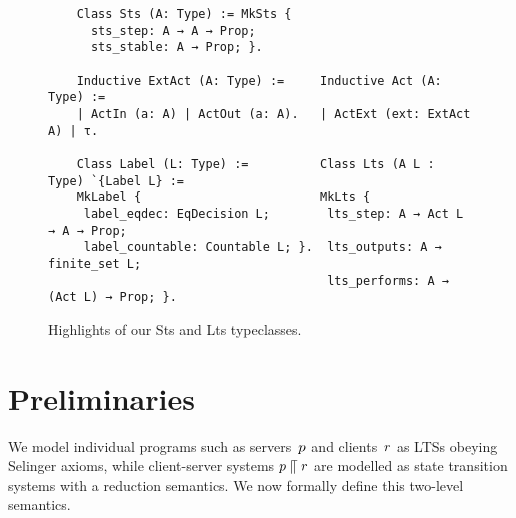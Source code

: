 

\begin{figure}[t]
  \hrulefill
  \begin{verbatim}
    Class Sts (A: Type) := MkSts {
      sts_step: A → A → Prop;
      sts_stable: A → Prop; }.

    Inductive ExtAct (A: Type) :=     Inductive Act (A: Type) :=
    | ActIn (a: A) | ActOut (a: A).   | ActExt (ext: ExtAct A) | τ.

    Class Label (L: Type) :=          Class Lts (A L : Type) `{Label L} := 
    MkLabel {                         MkLts {
     label_eqdec: EqDecision L;        lts_step: A → Act L → A → Prop;
     label_countable: Countable L; }.  lts_outputs: A → finite_set L;
                                       lts_performs: A → (Act L) → Prop; }.
  \end{verbatim}
  \caption{Highlights of our Sts and Lts typeclasses.}
  \label{fig:mechanisation-lts}
  \label{fig:sketch-mechanisation-sts}
  \hrulefill
\end{figure}




\section{Preliminaries}
\label{sec:preliminaries}
We model individual programs such as
servers~$p$ and clients~$r$ %
as LTSs obeying Selinger axioms, while client-server systems
$p \mathrel{\llceil} r$ are modelled as state transition systems
with a reduction semantics. We now formally define this two-level
semantics.


